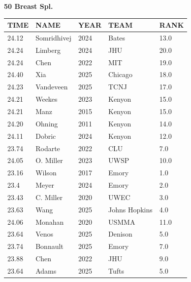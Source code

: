 \begin{table}[H]
\centering
\begin{minipage}[t]{0.6\textwidth}
\centering
\textbf{50 Breast Spl.}\\[0.1cm]
\begin{tabular}{@{}p{1.8cm}p{2.8cm}p{1.2cm}p{1.4cm}p{0.8cm}@{}}
\hline
    \textbf{TIME} & \textbf{NAME} & \textbf{YEAR} & \textbf{TEAM} & \textbf{RANK} \\
\hline
    24.12 & Somridhivej & 2024 & Bates & 13.0 \\
    24.24 & Limberg & 2024 & JHU & 20.0 \\
    24.24 & Chen & 2022 & MIT & 19.0 \\
    24.40 & Xia & 2025 & Chicago & 18.0 \\
    24.23 & Vandeveen & 2025 & TCNJ & 17.0 \\
    24.21 & Weekes & 2023 & Kenyon & 15.0 \\
    24.21 & Manz & 2015 & Kenyon & 15.0 \\
    24.20 & Ohning & 2011 & Kenyon & 14.0 \\
    24.11 & Dobric & 2024 & Kenyon & 12.0 \\
    23.74 & Rodarte & 2022 & CLU & 7.0 \\
    24.05 & O. Miller & 2023 & UWSP & 10.0 \\
    23.16 & Wilson & 2017 & Emory & 1.0 \\
    23.4 & Meyer & 2024 & Emory & 2.0 \\
    23.43 & C. Miller & 2020 & UWEC & 3.0 \\
    23.63 & Wang & 2025 & Johns Hopkins & 4.0 \\
    24.06 & Monahan & 2020 & USMMA & 11.0 \\
    23.64 & Venos & 2025 & Denison & 5.0 \\
    23.74 & Bonnault & 2025 & Emory & 7.0 \\
    23.88 & Chen & 2022 & JHU & 9.0 \\
    23.64 & Adams & 2025 & Tufts & 5.0 \\
\hline
\end{tabular}
\end{minipage}
\end{table}

